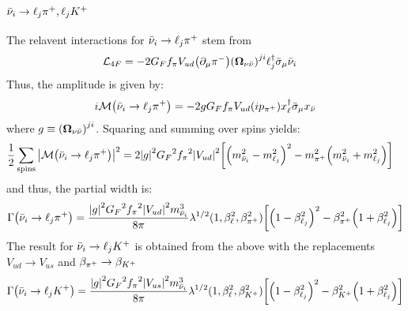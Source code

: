 \subsubsection{\texorpdfstring{\(\bar{\nu}_{i}\to\ell_{j}{\pi^{+}},\ell_{j}{K^{+}}\)}{RH-Neutrino to Charged Lepton and Charged Pion}}

The relavent interactions for \(\bar{\nu}_{i}\to\ell_{j}{\pi^{+}}\) stem from
\begin{align}
    \mathcal{L}_{4F} & = -2{G_{F}}{f_{\pi}}{V_{ud}}\qty(\partial_{\mu}{\pi^{-}})
    \qty(\bm{\Omega}_{\nu\bar{\nu}})^{ji}
    \ell_{j}^{\dagger}
    \bar{\sigma}_{\mu}
    \bar{\nu}_{i}
\end{align}
Thus, the amplitude is given by:
\begin{align}
    i\mathcal{M}\qty(\bar{\nu}_{i}\to\ell_{j}{\pi^{+}})
    =
    -2g{G_{F}}{f_{\pi}}{V_{ud}}\qty(ip_{{\pi^{+}}})
    x^{\dagger}_{\ell}\bar{\sigma}_{\mu}x_{\bar{\nu}}
\end{align}
where \(g\equiv \qty(\bm{\Omega}_{\nu\bar{\nu}})^{ji}\).
Squaring and summing over spins yields:
\begin{align}
    \frac{1}{2}\sum_{\mathrm{spins}}\qty|\mathcal{M}\qty(\bar{\nu}_{i}\to\ell_{j}{\pi^{+}})|^{2}
     & =
    2\qty|g|^{2}{G_{F}}^{2}{f_{\pi}}^{2}\qty|{V_{ud}}|^{2}
    \qty[\qty(m_{\bar{\nu}_{i}}^{2}-m_{\ell_{j}}^{2})^{2}
        - m_{{\pi^{+}}}^{2}\qty(m_{\bar{\nu}_{i}}^{2}+m_{\ell_{j}}^{2})]
\end{align}
and thus, the partial width is:
\begin{align}
    \Gamma\qty(\bar{\nu}_{i}\to\ell_{j}{\pi^{+}})
    =
    \frac{\qty|g|^{2}{G_{F}}^{2}{f_{\pi}}^{2}\qty|{V_{ud}}|^{2}m^{3}_{\bar{\nu}_{i}}}{8\pi}
    \lambda^{1/2}(1,\beta_{\ell}^2,\beta_{{\pi^{+}}}^{2})
    \qty[\qty(1-\beta_{\ell_{j}}^{2})^{2}
        - \beta_{{\pi^{+}}}^{2}\qty(1+\beta_{\ell_{j}}^{2})]
\end{align}
The result for \(\bar{\nu}_{i}\to\ell_{j}K^{+}\) is obtained from the above with
the replacements \(V_{ud}\to V_{us}\) and \(\beta_{{\pi^{+}}}\to\beta_{{K^{+}}}\)
\begin{align}
    \Gamma\qty(\bar{\nu}_{i}\to\ell_{j}{K^{+}})
    =
    \frac{\qty|g|^{2}{G_{F}}^{2}{f_{\pi}}^{2}\qty|{V_{us}}|^{2}m^{3}_{\bar{\nu}_{i}}}{8\pi}
    \lambda^{1/2}(1,\beta_{\ell}^2,\beta_{{K^{+}}}^{2})
    \qty[\qty(1-\beta_{\ell_{j}}^{2})^{2}
        - \beta_{{K^{+}}}^{2}\qty(1+\beta_{\ell_{j}}^{2})]
\end{align}